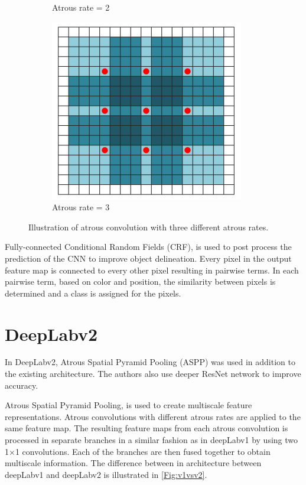 \begin{figure}[!htb]
\begin{subfigure}{.3\textwidth}
			\caption{Atrous rate = 2}
		\end{subfigure}
		\begin{subfigure}{.3\textwidth}
			\centering
			\includegraphics[width=1\linewidth]{images/r_3}
			\caption{Atrous rate = 3}
		\end{subfigure}
		\caption{Illustration of atrous convolution with three different atrous rates.}
		\label{Fig:atconv}
	\end{figure}
	
Fully-connected Conditional Random Fields (CRF), is used to post process the prediction of the CNN to improve object delineation. Every pixel in the output feature map is connected to every other pixel resulting in pairwise terms. In each pairwise term, based on color and position, the similarity between pixels is determined and a class is assigned for the pixels.


\section{DeepLabv2}

In DeepLabv2, Atrous Spatial Pyramid Pooling (ASPP) was used in addition to the existing architecture. The authors also use deeper ResNet network to improve accuracy.

Atrous Spatial Pyramid Pooling, is used to create multiscale feature representations. Atrous convolutions with different atrous rates are applied to the same feature map. The resulting feature maps from each atrous convolution is processed in separate branches in a similar fashion as in deepLabv1 by using two 1$\times$1 convolutions. Each of the branches are then fused together to obtain multiscale information. The difference between in architecture between deepLabv1 and deepLabv2 is illustrated in \ref{Fig:v1vsv2}.

